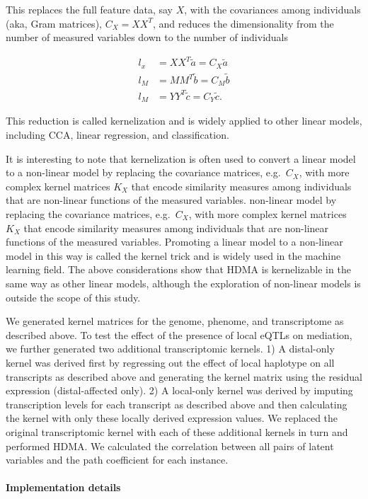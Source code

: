 \documentclass[
]{article}
\begin{document}
This replaces the full feature data, say \(X\), with the covariances
among individuals (aka, Gram matrices), \(C_X = XX^T\), and reduces the
dimensionality from the number of measured variables down to the number
of individuals

\begin{align}
l_x &= XX^T \tilde{a} = C_X \tilde{a} \\
l_M &= MM^T \tilde{b} = C_M \tilde{b} \\
l_M &= YY^T \tilde{c} = C_Y \tilde{c}.
\end{align}

This reduction is called kernelization \cite{tenenhaus2015kernel} and is
widely applied to other linear models, including CCA, linear regression,
and classification.

It is interesting to note that kernelization is often used to convert a
linear model to a non-linear model by replacing the covariance matrices,
e.g.~\(C_X\), with more complex kernel matrices \(K_X\) that encode
similarity measures among individuals that are non-linear functions of
the measured variables. non-linear model by replacing the covariance
matrices, e.g.~\(C_X\), with more complex kernel matrices \(K_X\) that
encode similarity measures among individuals that are non-linear
functions of the measured variables. Promoting a linear model to a
non-linear model in this way is called the kernel trick and is widely
used in the machine learning field. The above considerations show that
HDMA is kernelizable in the same way as other linear models, although
the exploration of non-linear models is outside the scope of this study.

We generated kernel matrices for the genome, phenome, and transcriptome
as described above. To test the effect of the presence of local eQTLs on
mediation, we further generated two additional transcriptomic kernels.
1) A distal-only kernel was derived first by regressing out the effect
of local haplotype on all transcripts as described above and generating
the kernel matrix using the residual expression (distal-affected only).
2) A local-only kernel was derived by imputing transcription levels for
each transcript as described above and then calculating the kernel with
only these locally derived expression values. We replaced the original
transcriptomic kernel with each of these additional kernels in turn and
performed HDMA. We calculated the correlation between all pairs of
latent variables and the path coefficient for each instance.

\paragraph{Implementation details}\label{implementation-details}
\end{document}
